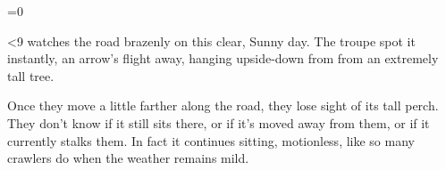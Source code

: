 \ifnum\value{temperature}=0

  \ifnum\value{fenestraDay}<9
   watches the road brazenly on this clear, Sunny day.
  The troupe spot it instantly, an arrow's flight away, hanging upside-down from from an extremely tall tree.
  
  \chitincrawler
  
  Once they move a little farther along the road, they lose sight of its tall perch.
  They don't know if it still sits there, or if it's moved away from them, or if it currently stalks them.
  In fact it continues sitting, motionless, like so many \glspl{crawler} do when the weather remains mild.
  
  \fi
\fi
